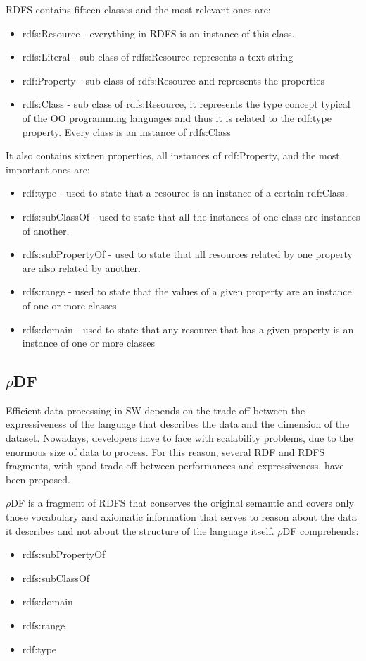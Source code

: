 RDFS contains fifteen classes and the most relevant ones are:

\begin{itemize}
\item rdfs:Resource - everything in RDFS is an instance of this class.
\item rdfs:Literal  -  sub class of rdfs:Resource represents a text string
\item rdf:Property  -  sub class of rdfs:Resource and represents the properties
\item rdfs:Class    -  sub class of rdfs:Resource, it represents the type concept typical of the OO programming languages and thus it is related to the rdf:type property. Every class is an instance of rdfs:Class
\end{itemize}

It also contains sixteen properties, all instances of rdf:Property, and the most important ones are:
\begin{itemize}
\item rdf:type - used to state that a resource is an instance of a certain rdf:Class.
\item rdfs:subClassOf - used to state that all the instances of one class are instances of another.
\item rdfs:subPropertyOf - used to state that all resources related by one property are also related by another.
\item rdfs:range - used to state that the values of a given property are an instance of one or more classes
\item rdfs:domain -  used to state that any resource that has a given property is an instance of one or more classes
\end{itemize}


\subsection{$\rho$DF}\label{sec:rhodf}

Efficient data processing in SW depends on the trade off between the expressiveness of the language that describes the data and the dimension of the dataset. Nowadays, developers have to face with scalability problems, due to the enormous size of data to process. For this reason, several RDF and RDFS fragments, with good trade off between performances and expressiveness, have been proposed.

$\rho$DF is a fragment of RDFS that conserves the original semantic and covers only those vocabulary and axiomatic information that  serves to reason about the data it describes and not about the structure of the language itself. $\rho$DF comprehends:
\begin{itemize}
\item rdfs:subPropertyOf
\item rdfs:subClassOf
\item rdfs:domain 
\item rdfs:range
\item rdf:type 
\end{itemize}


